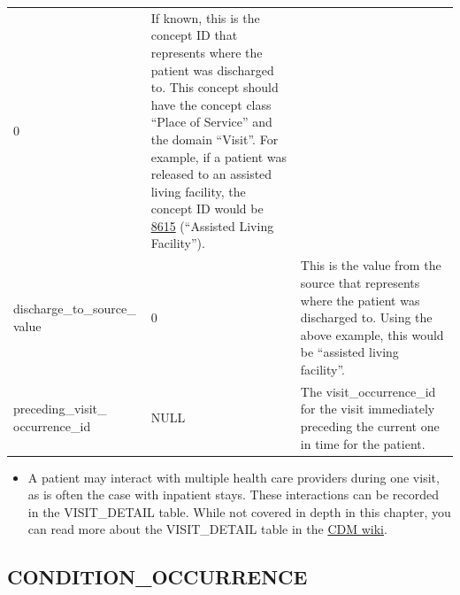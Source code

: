 \documentclass[11pt]{book}
\providecommand{\tightlist}{%
  \setlength{\itemsep}{0pt}\setlength{\parskip}{0pt}}
\theoremstyle{definition}
\theoremstyle{definition}
\theoremstyle{definition}
\theoremstyle{remark}
\begin{document}
\begin{longtable}[]{@{}lll@{}}
\begin{minipage}[t]{0.15\columnwidth}
0\strut
\end{minipage} & \begin{minipage}[t]{0.49\columnwidth}\raggedright
If known, this is the concept ID that represents where the patient was discharged to. This concept should have the concept class ``Place of Service'' and the domain ``Visit''. For example, if a patient was released to an assisted living facility, the concept ID would be \href{http://athena.ohdsi.org/search-terms/terms/8615}{8615} (``Assisted Living Facility'').\strut
\end{minipage}\tabularnewline
\begin{minipage}[t]{0.28\columnwidth}\raggedright
discharge\_to\_source\_ value\strut
\end{minipage} & \begin{minipage}[t]{0.15\columnwidth}\raggedright
0\strut
\end{minipage} & \begin{minipage}[t]{0.49\columnwidth}\raggedright
This is the value from the source that represents where the patient was discharged to. Using the above example, this would be ``assisted living facility''.\strut
\end{minipage}\tabularnewline
\begin{minipage}[t]{0.28\columnwidth}\raggedright
preceding\_visit\_ occurrence\_id\strut
\end{minipage} & \begin{minipage}[t]{0.15\columnwidth}\raggedright
NULL\strut
\end{minipage} & \begin{minipage}[t]{0.49\columnwidth}\raggedright
The visit\_occurrence\_id for the visit immediately preceding the current one in time for the patient.\strut
\end{minipage}\tabularnewline
\bottomrule
\end{longtable}

\begin{itemize}
\tightlist
\item
  A patient may interact with multiple health care providers during one visit, as is often the case with inpatient stays. These interactions can be recorded in the VISIT\_DETAIL table. While not covered in depth in this chapter, you can read more about the VISIT\_DETAIL table in the \href{https://github.com/OHDSI/CommonDataModel/wiki/VISIT_DETAIL}{CDM wiki}.
\end{itemize}

\hypertarget{conditionOccurrence}{%
\subsection{CONDITION\_OCCURRENCE}\label{conditionOccurrence}}
\end{document}
